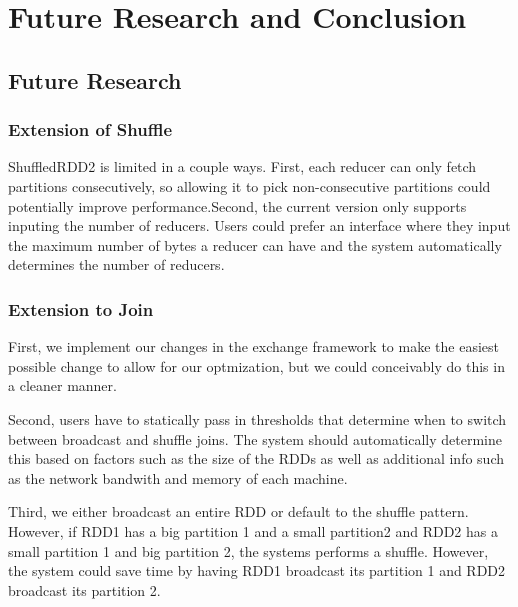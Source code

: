 \chapter{Future Research and Conclusion}

\section{Future Research}

\subsection{Extension of Shuffle}

ShuffledRDD2 is limited in a couple ways. First, each reducer can only 
fetch partitions consecutively, so allowing it to pick non-consecutive partitions could potentially 
improve performance.Second, the current version only supports inputing the number of reducers. Users could prefer
an interface where they input the maximum number of bytes a reducer can have and the system automatically determines the 
number of reducers.

\subsection {Extension to Join}

First, we implement our changes in the exchange framework to make the easiest possible change to allow for our optmization,
but we could conceivably do this in a cleaner manner.

Second, users have to statically pass in thresholds that determine when to switch between broadcast and
shuffle joins. The system should automatically determine this based on factors such as the size of the RDDs
 as well as additional info such as the network bandwith and memory of each machine.

Third, we either broadcast an entire RDD or default to the shuffle pattern. However, if RDD1 has a big partition 1 and
a small partition2 and RDD2 has a small partition 1 and big partition 2, the systems performs  a shuffle. However, the system could save time
by having RDD1 broadcast its partition 1 and RDD2 broadcast its partition 2.


